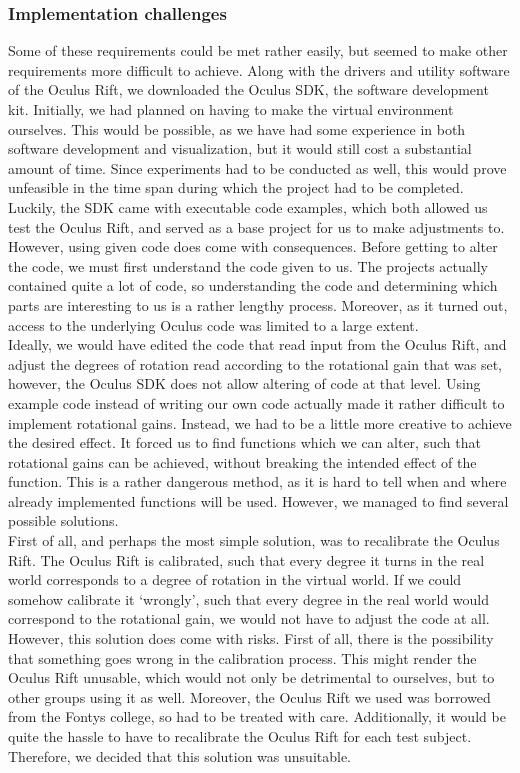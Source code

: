 \subsubsection{Implementation challenges}
Some of these requirements could be met rather easily, but seemed to make other requirements more difficult to achieve.
Along with the drivers and utility software of the Oculus Rift, we downloaded the Oculus SDK, the software development kit.
Initially, we had planned on having to make the virtual environment ourselves.
This would be possible, as we have had some experience in both software development and visualization, but it would still cost a substantial amount of time.
Since experiments had to be conducted as well, this would prove unfeasible in the time span during which the project had to be completed.
Luckily, the SDK came with executable code examples, which both allowed us test the Oculus Rift, and served as a base project for us to make adjustments to. \\
However, using given code does come with consequences.
Before getting to alter the code, we must first understand the code given to us.
The projects actually contained quite a lot of code, so understanding the code and determining which parts are interesting to us is a rather lengthy process.
Moreover, as it turned out, access to the underlying Oculus code was limited to a large extent. \\

Ideally, we would have edited the code that read input from the Oculus Rift, and adjust the degrees of rotation read according to the rotational gain that was set, however, the Oculus SDK does not allow altering of code at that level.
Using example code instead of writing our own code actually made it rather difficult to implement rotational gains.
Instead, we had to be a little more creative to achieve the desired effect.
It forced us to find functions which we can alter, such that rotational gains can be achieved, without breaking the intended effect of the function.
This is a rather dangerous method, as it is hard to tell when and where already implemented functions will be used.
However, we managed to find several possible solutions. \\

First of all, and perhaps the most simple solution, was to recalibrate the Oculus Rift.
The Oculus Rift is calibrated, such that every degree it turns in the real world corresponds to a degree of rotation in the virtual world.
If we could somehow calibrate it `wrongly', such that every degree in the real world would correspond to the rotational gain, we would not have to adjust the code at all.
However, this solution does come with risks.
First of all, there is the possibility that something goes wrong in the calibration process.
This might render the Oculus Rift unusable, which would not only be detrimental to ourselves, but to other groups using it as well.
Moreover, the Oculus Rift we used was borrowed from the Fontys college, so had to be treated with care.
Additionally, it would be quite the hassle to have to recalibrate the Oculus Rift for each test subject.
Therefore, we decided that this solution was unsuitable.\\


